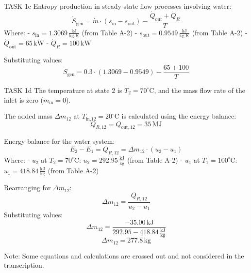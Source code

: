TASK 1c  
Entropy production in steady-state flow processes involving water:  
\[
\dot{S}_{\text{gen}} = \dot{m} \cdot (s_{\text{in}} - s_{\text{out}}) - \frac{\dot{Q}_{\text{out}} + \dot{Q}_R}{T}
\]  
Where:  
- \( s_{\text{in}} = 1.3069 \, \frac{\text{kJ}}{\text{kg·K}} \) (from Table A-2)  
- \( s_{\text{out}} = 0.9549 \, \frac{\text{kJ}}{\text{kg·K}} \) (from Table A-2)  
- \( \dot{Q}_{\text{out}} = 65 \, \text{kW} \)  
- \( \dot{Q}_R = 100 \, \text{kW} \)  

Substituting values:  
\[
\dot{S}_{\text{gen}} = 0.3 \cdot (1.3069 - 0.9549) - \frac{65 + 100}{T}
\]  

TASK 1d  
The temperature at state 2 is \( T_2 = 70^\circ\text{C} \), and the mass flow rate of the inlet is zero (\( \dot{m}_{\text{in}} = 0 \)).  

The added mass \( \Delta m_{12} \) at \( T_{\text{in,12}} = 20^\circ\text{C} \) is calculated using the energy balance:  
\[
Q_{R,12} = Q_{\text{out},12} = 35 \, \text{MJ}
\]  

Energy balance for the water system:  
\[
E_2 - E_1 = Q_{R,12} = \Delta m_{12} \cdot (u_2 - u_1)
\]  
Where:  
- \( u_2 \) at \( T_2 = 70^\circ\text{C} \): \( u_2 = 292.95 \, \frac{\text{kJ}}{\text{kg}} \) (from Table A-2)  
- \( u_1 \) at \( T_1 = 100^\circ\text{C} \): \( u_1 = 418.84 \, \frac{\text{kJ}}{\text{kg}} \) (from Table A-2)  

Rearranging for \( \Delta m_{12} \):  
\[
\Delta m_{12} = \frac{Q_{R,12}}{u_2 - u_1}
\]  
Substituting values:  
\[
\Delta m_{12} = \frac{-35.00 \, \text{kJ}}{292.95 - 418.84 \, \frac{\text{kJ}}{\text{kg}}}
\]  
\[
\Delta m_{12} = 277.8 \, \text{kg}
\]  

Note: Some equations and calculations are crossed out and not considered in the transcription.